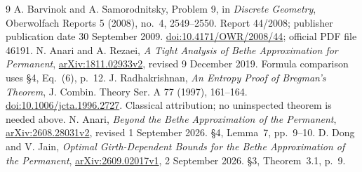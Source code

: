 \documentclass[11pt]{article}
\begin{document}
\begin{thebibliography}{9}
 A. Barvinok and A. Samorodnitsky, Problem 9, in \emph{Discrete Geometry}, Oberwolfach Reports 5 (2008), no.~4, 2549--2550. Report 44/2008; publisher publication date 30 September 2009. \href{https://doi.org/10.4171/OWR/2008/44}{doi:10.4171/OWR/2008/44}; official PDF file 46191.
 N. Anari and A. Rezaei, \emph{A Tight Analysis of Bethe Approximation for Permanent}, \href{https://arxiv.org/abs/1811.02933v2}{arXiv:1811.02933v2}, revised 9 December 2019. Formula comparison uses \S4, Eq.~(6), p.~12.
 J. Radhakrishnan, \emph{An Entropy Proof of Bregman's Theorem}, J. Combin. Theory Ser. A 77 (1997), 161--164. \href{https://doi.org/10.1006/jcta.1996.2727}{doi:10.1006/jcta.1996.2727}. Classical attribution; no uninspected theorem is needed above.
 N. Anari, \emph{Beyond the Bethe Approximation of the Permanent}, \href{https://arxiv.org/abs/2608.28031v2}{arXiv:2608.28031v2}, revised 1 September 2026. \S4, Lemma~7, pp.~9--10.
 D. Dong and V. Jain, \emph{Optimal Girth-Dependent Bounds for the Bethe Approximation of the Permanent}, \href{https://arxiv.org/abs/2609.02017v1}{arXiv:2609.02017v1}, 2 September 2026. \S3, Theorem~3.1, p.~9.
\end{thebibliography}
\end{document}

